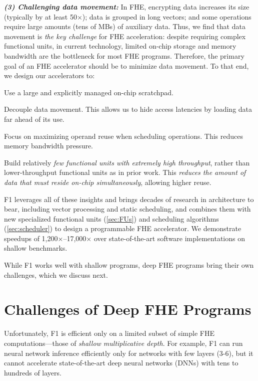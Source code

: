 \noindent \textbf{\emph{(3) Challenging data movement:}}
In FHE, encrypting data increases its size (typically by at least 50$\times$);
data is grouped in long vectors; and some operations require large amounts
(tens of MBs) of auxiliary data. Thus, we find that data movement is \emph{the
key challenge} for FHE acceleration: despite requiring complex functional
units, in current technology, limited on-chip storage and memory bandwidth are
the bottleneck for most FHE programs. Therefore, the primary goal of an FHE
accelerator should be to
minimize data movement. To that end, we design our accelerators to:
\begin{compactenum}
\item Use a large and explicitly managed on-chip scratchpad.
\item Decouple data movement. This allows us to hide access latencies by
    loading data far ahead of its use.
\item Focus on maximizing operand reuse when scheduling operations. This reduces
    memory bandwidth pressure.
\item Build relatively \emph{few functional units with extremely high
    throughput}, rather than lower-throughput functional units as in prior
    work. This \emph{reduces the amount of data that must reside on-chip
    simultaneously}, allowing higher reuse.
\end{compactenum}

F1 leverages all of these insights and brings decades of research in
architecture to bear, including vector processing and static scheduling, and
combines them with new specialized functional units (\autoref{sec:FUs}) and
scheduling algorithms (\autoref{sec:scheduler}) to design a programmable FHE
accelerator. We demonstrate speedups of 1,200$\times$--17,000$\times$ over
state-of-the-art software implementations on shallow benchmarks.

While F1 works well with shallow programs, deep FHE programs bring their own
challenges, which we discuss next.

\section{Challenges of Deep FHE Programs}

Unfortunately, F1 is efficient only on a limited subset of simple FHE
computations---those of \emph{shallow multiplicative depth}. For example, F1
can run neural network inference efficiently only for networks with few layers
(3-6), but it cannot accelerate state-of-the-art deep neural networks (DNNs)
with tens to hundreds of layers.

